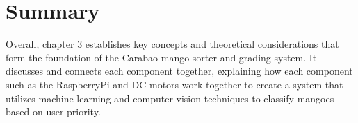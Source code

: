 \section{Summary}

Overall, chapter 3 establishes key concepts and theoretical considerations that form the foundation of the Carabao mango sorter and grading system. It discusses and connects each component together, explaining how each component such as the RaspberryPi and DC motors work together to create a system that utilizes machine learning and computer vision techniques to classify mangoes based on user priority.
